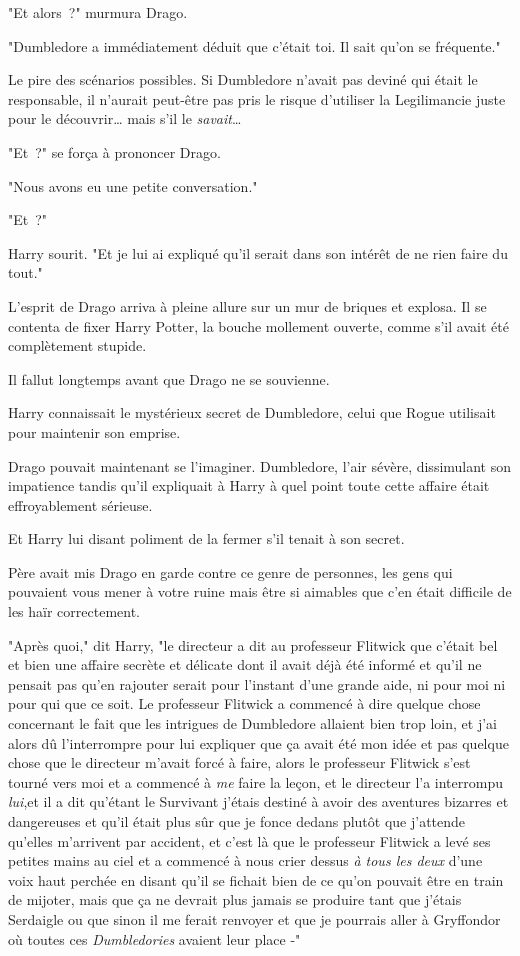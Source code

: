 "Et alors~?" murmura Drago.

"Dumbledore a immédiatement déduit que c'était toi. Il sait qu'on se fréquente."

Le pire des scénarios possibles. Si Dumbledore n'avait pas deviné qui était le responsable, il n'aurait peut-être pas pris le risque d'utiliser la Legilimancie juste pour le découvrir… mais s'il le \emph{savait}…

"Et~?" se força à prononcer Drago.

"Nous avons eu une petite conversation."

"Et~?"

Harry sourit. "Et je lui ai expliqué qu'il serait dans son intérêt de ne rien faire du tout."

L'esprit de Drago arriva à pleine allure sur un mur de briques et explosa. Il se contenta de fixer Harry Potter, la bouche mollement ouverte, comme s'il avait été complètement stupide.

Il fallut longtemps avant que Drago ne se souvienne.

Harry connaissait le mystérieux secret de Dumbledore, celui que Rogue utilisait pour maintenir son emprise.

Drago pouvait maintenant se l'imaginer. Dumbledore, l'air sévère, dissimulant son impatience tandis qu'il expliquait à Harry à quel point toute cette affaire était effroyablement sérieuse.

Et Harry lui disant poliment de la fermer s'il tenait à son secret.

Père avait mis Drago en garde contre ce genre de personnes, les gens qui pouvaient vous mener à votre ruine mais être si aimables que c'en était difficile de les haïr correctement.

"Après quoi," dit Harry, "le directeur a dit au professeur Flitwick que c'était bel et bien une affaire secrète et délicate dont il avait déjà été informé et qu'il ne pensait pas qu'en rajouter serait pour l'instant d'une grande aide, ni pour moi ni pour qui que ce soit. Le professeur Flitwick a commencé à dire quelque chose concernant le fait que les intrigues de Dumbledore allaient bien trop loin, et j'ai alors dû l'interrompre pour lui expliquer que ça avait été mon idée et pas quelque chose que le directeur m'avait forcé à faire, alors le professeur Flitwick s'est tourné vers moi et a commencé à \emph{me} faire la leçon, et le directeur l'a interrompu \emph{lui},et il a dit qu'étant le Survivant j'étais destiné à avoir des aventures bizarres et dangereuses et qu'il était plus sûr que je fonce dedans plutôt que j'attende qu'elles m'arrivent par accident, et c'est là que le professeur Flitwick a levé ses petites mains au ciel et a commencé à nous crier dessus \emph{à tous les deux} d'une voix haut perchée en disant qu'il se fichait bien de ce qu'on pouvait être en train de mijoter, mais que ça ne devrait plus jamais se produire tant que j'étais Serdaigle ou que sinon il me ferait renvoyer et que je pourrais aller à Gryffondor où toutes ces \emph{Dumbledories} avaient leur place -"

